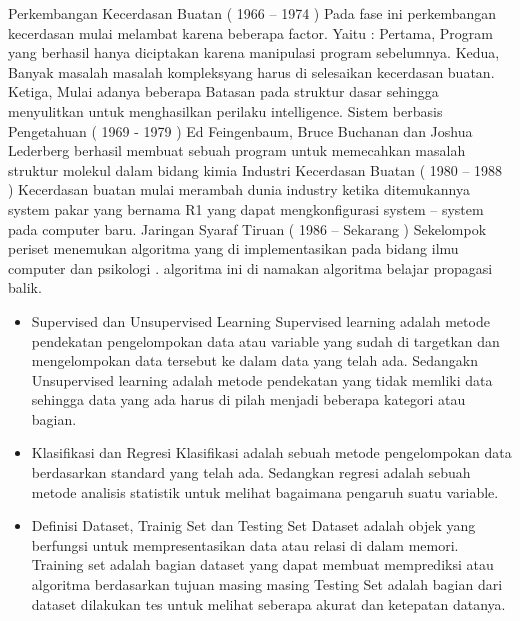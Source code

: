 \begin{enumerate}
    Perkembangan Kecerdasan Buatan ( 1966  –  1974 )
    Pada fase ini perkembangan kecerdasan mulai melambat karena beberapa factor. Yaitu : 
    Pertama, Program yang berhasil  hanya diciptakan karena manipulasi program sebelumnya.
    Kedua, Banyak masalah masalah kompleksyang harus di selesaikan kecerdasan buatan.
    Ketiga, Mulai adanya beberapa Batasan pada struktur dasar sehingga menyulitkan untuk menghasilkan perilaku intelligence.
    Sistem berbasis Pengetahuan ( 1969 - 1979 )
     Ed Feingenbaum, Bruce Buchanan dan Joshua Lederberg berhasil membuat sebuah program untuk memecahkan masalah struktur molekul dalam bidang kimia
    Industri Kecerdasan Buatan ( 1980 – 1988 )
    Kecerdasan buatan mulai merambah dunia industry ketika ditemukannya system pakar yang bernama R1 yang dapat mengkonfigurasi system – system pada computer baru.
    Jaringan Syaraf Tiruan ( 1986 – Sekarang )
    Sekelompok periset menemukan algoritma yang di implementasikan pada bidang ilmu computer dan psikologi .  algoritma ini di namakan algoritma belajar propagasi balik.
\begin{itemize}
		\item Supervised dan Unsupervised Learning
		\hfill\break
	Supervised learning adalah metode pendekatan pengelompokan data atau variable yang sudah di targetkan dan mengelompokan data tersebut ke dalam data yang telah ada. Sedangakn Unsupervised learning adalah metode pendekatan yang tidak memliki data sehingga data yang ada harus di pilah menjadi beberapa kategori atau bagian.
		\item Klasifikasi dan Regresi
		\hfill\break
		Klasifikasi adalah sebuah metode pengelompokan data berdasarkan standard yang telah ada. Sedangkan regresi adalah sebuah metode analisis statistik untuk melihat bagaimana pengaruh suatu variable.
		\item Definisi Dataset, Trainig Set dan Testing Set
		\hfill\break
        Dataset adalah objek yang berfungsi untuk mempresentasikan data atau relasi di dalam memori.
        Training set adalah bagian dataset yang dapat membuat memprediksi atau algoritma berdasarkan tujuan masing masing
        Testing Set adalah bagian dari dataset dilakukan tes untuk melihat seberapa akurat dan ketepatan datanya.  
	\end{itemize}
\end{enumerate}
